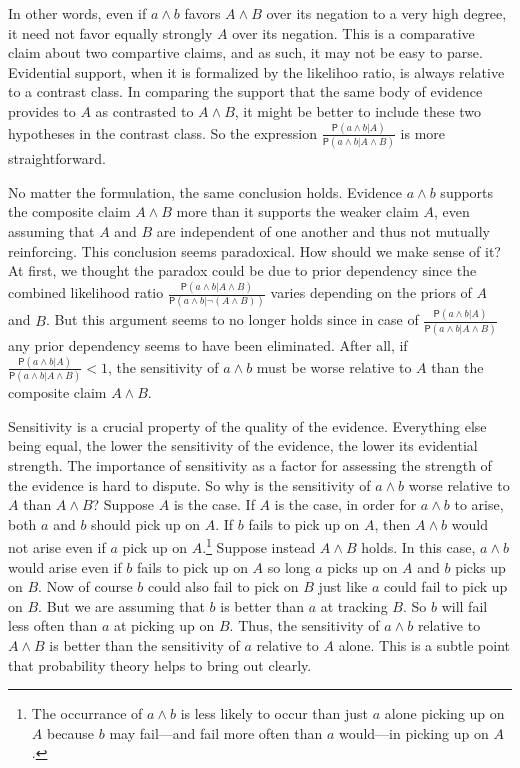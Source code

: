 \documentclass[
  10pt,
  dvipsnames,enabledeprecatedfontcommands]{scrartcl}
\newcommand{\pr}[1]{\mathsf{P}(#1)}
\begin{document}
\noindent In other words, even if \(a\wedge b\) favors \(A\wedge B\)
over its negation to a very high degree, it need not favor equally
strongly \(A\) over its negation. This is a comparative claim about two
compartive claims, and as such, it may not be easy to parse. Evidential
support, when it is formalized by the likelihoo ratio, is always
relative to a contrast class. In comparing the support that the same
body of evidence provides to \(A\) as contrasted to \(A\wedge B\), it
might be better to include these two hypotheses in the contrast class.
So the expression
\(\frac{\pr{a\wedge b \vert A}}{\pr{a\wedge b \vert A \wedge B}}\) is
more straightforward.

No matter the formulation, the same conclusion holds. Evidence
\(a\wedge b\) supports the composite claim \(A\wedge B\) more than it
supports the weaker claim \(A\), even assuming that \(A\) and \(B\) are
independent of one another and thus not mutually reinforcing. This
conclusion seems paradoxical. How should we make sense of it? At first,
we thought the paradox could be due to prior dependency since the
combined likelihood ratio
\(\frac{\pr{a\wedge b \vert A \wedge B}}{\pr{a\wedge b \vert \neg (A \wedge B)}}\)
varies depending on the priors of \(A\) and \(B\). But this argument
seems to no longer holds since in case of
\(\frac{\pr{a\wedge b \vert A}}{\pr{a\wedge b \vert A \wedge B}}\) any
prior dependency seems to have been eliminated. After all, if
\(\frac{\pr{a\wedge b \vert A}}{\pr{a\wedge b \vert A \wedge B}}<1\),
the sensitivity of \(a\wedge b\) must be worse relative to \(A\) than
the composite claim \(A \wedge B\).

Sensitivity is a crucial property of the quality of the evidence.
Everything else being equal, the lower the sensitivity of the evidence,
the lower its evidential strength. The importance of sensitivity as a
factor for assessing the strength of the evidence is hard to dispute. So
why is the sensitivity of \(a\wedge b\) worse relative to \(A\) than
\(A \wedge B\)? Suppose \(A\) is the case. If \(A\) is the case, in
order for \(a\wedge b\) to arise, both \(a\) and \(b\) should pick up on
\(A\). If \(b\) fails to pick up on \(A\), then \(A \wedge b\) would not
arise even if \(a\) pick up on
\(A\).\footnote{The occurrance of $a\wedge b$ is less likely to occur than just $a$ alone picking up on $A$ because $b$ may fail---and fail more often than $a$ would---in picking up on $A$.}
Suppose instead \(A\wedge B\) holds. In this case, \(a\wedge b\) would
arise even if \(b\) fails to pick up on \(A\) so long \(a\) picks up on
\(A\) and \(b\) picks up on \(B\). Now of course \(b\) could also fail
to pick on \(B\) just like \(a\) could fail to pick up on \(B\). But we
are assuming that \(b\) is better than \(a\) at tracking \(B\). So \(b\)
will fail less often than \(a\) at picking up on \(B\). Thus, the
sensitivity of \(a\wedge b\) relative to \(A\wedge B\) is better than
the sensitivity of \(a\) relative to \(A\) alone. This is a subtle point
that probability theory helps to bring out clearly.
\end{document}
